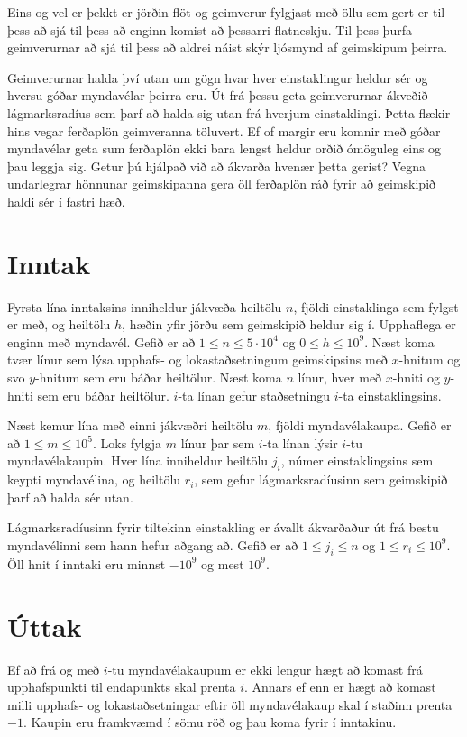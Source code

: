 
Eins og vel er þekkt er jörðin flöt og geimverur fylgjast með
öllu sem gert er til þess að sjá til þess að enginn komist
að þessarri flatneskju. Til þess þurfa geimverurnar að sjá
til þess að aldrei náist skýr ljósmynd af geimskipum þeirra.

Geimverurnar halda því utan um gögn hvar hver einstaklingur
heldur sér og hversu góðar myndavélar þeirra eru.
Út frá þessu geta geimverurnar ákveðið lágmarksradíus sem
þarf að halda sig utan frá hverjum einstaklingi. Þetta
flækir hins vegar ferðaplön geimveranna töluvert. Ef of
margir eru komnir með góðar myndavélar geta sum ferðaplön
ekki bara lengst heldur orðið ómöguleg eins og þau leggja sig.
Getur þú hjálpað við að ákvarða hvenær þetta gerist?
Vegna undarlegrar hönnunar geimskipanna gera öll ferðaplön
ráð fyrir að geimskipið haldi sér í fastri hæð.

\section*{Inntak}
Fyrsta lína inntaksins inniheldur jákvæða heiltölu $n$,
fjöldi einstaklinga sem fylgst er með, og heiltölu $h$,
hæðin yfir jörðu sem geimskipið heldur sig í. 
Upphaflega er enginn með myndavél.
Gefið er að $1 \leq n \leq 5 \cdot 10^4$ og $0 \leq h \leq 10^9$.
Næst koma tvær línur sem lýsa upphafs- og lokastaðsetningum
geimskipsins með $x$-hnitum og svo $y$-hnitum sem eru báðar
heiltölur.
Næst koma $n$ línur, hver með $x$-hniti og $y$-hniti sem
eru báðar heiltölur. $i$-ta línan gefur staðsetningu
$i$-ta einstaklingsins.

Næst kemur lína með einni jákvæðri heiltölu $m$, 
fjöldi myndavélakaupa.
Gefið er að $1 \leq m \leq 10^5$.
Loks fylgja $m$ línur þar sem $i$-ta línan lýsir $i$-tu
myndavélakaupin.
Hver lína inniheldur heiltölu $j_i$, númer einstaklingsins
sem keypti myndavélina, og heiltölu $r_i$,
sem gefur lágmarksradíusinn sem geimskipið þarf að halda sér utan.

Lágmarksradíusinn fyrir tiltekinn einstakling er ávallt
ákvarðaður út frá bestu myndavélinni sem hann hefur aðgang að.
Gefið er að $1 \leq j_i \leq n$ og $1 \leq r_i \leq 10^9$.
Öll hnit í inntaki eru minnst $-10^{9}$ og mest $10^9$.

\section*{Úttak}
Ef að frá og með $i$-tu myndavélakaupum er ekki lengur hægt
að komast frá upphafspunkti til endapunkts skal prenta $i$.
Annars ef enn er hægt að komast milli upphafs- og lokastaðsetningar eftir öll myndavélakaup skal í staðinn
prenta $-1$.
Kaupin eru framkvæmd í sömu röð og þau koma fyrir í inntakinu.
